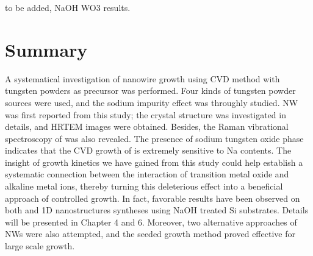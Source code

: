 to be added, NaOH WO3 results. 


\section{Summary}

A systematical investigation of  nanowire growth using CVD method with tungsten powders as precursor was performed. Four kinds of tungsten powder sources were used, and the sodium impurity effect was throughly studied.  NW was first reported from this study; the crystal structure was investigated in details, and HRTEM images were obtained. Besides, the Raman vibrational spectroscopy of  was also revealed. The presence of sodium tungsten oxide phase indicates that the CVD growth of  is extremely sensitive to Na contents. The insight of  growth kinetics we have gained from this study could help establish a systematic connection between the interaction of transition metal oxide and alkaline metal ions, thereby turning this deleterious effect into a beneficial approach of controlled growth. In fact, favorable results have been observed on both  and  1D nanostructures syntheses using NaOH treated Si substrates. Details will be presented in Chapter 4 and 6. Moreover, two alternative approaches of  NWs were also attempted, and the seeded growth method proved effective for large scale growth. 




